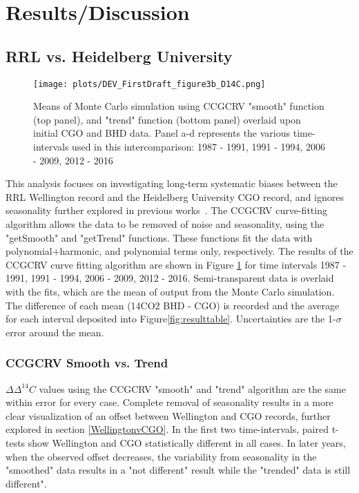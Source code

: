 \section{Results/Discussion}
\subsection{RRL vs. Heidelberg University}


\begin{figure}[h!]
  \texttt{[image: plots/DEV\_FirstDraft\_figure3b\_D14C.png]}
  \caption{Means of Monte Carlo simulation using CCGCRV "smooth" function (top panel), and "trend" function (bottom panel) overlaid upon initial CGO and BHD data. Panel a-d represents the various time-intervals used in this intercomparison: 1987 - 1991, 1991 - 1994, 2006 - 2009, 2012 - 2016}
  \label{fig:results1}
\end{figure}

This analysis focuses on investigating long-term systematic biases between the RRL Wellington record and the Heidelberg University CGO record, and ignores seasonality further explored in previous works~\cite{turnbull2017}. The CCGCRV curve-fitting algorithm allows the data to be removed of noise and seasonality, using the "getSmooth" and "getTrend" functions. These functions fit the data with polynomial+harmonic, and polynomial terms only, respectively. The results of the CCGCRV curve fitting algorithm are shown in Figure \ref{fig:results1} for time intervals 1987 - 1991, 1991 - 1994, 2006 - 2009, 2012 - 2016. Semi-transparent data is overlaid with the fits, which are the mean of output from the Monte Carlo simulation. The difference of each mean (14CO2 BHD - CGO) is recorded and the average for each interval deposited into Figure\ref{fig:resulttable}. Uncertainties are the 1-$\sigma$ error around the mean.

\subsubsection{CCGCRV Smooth vs. Trend}
${\Delta\Delta^{14}C}$ values using the CCGCRV "smooth" and "trend" algorithm are the same within error for every case. Complete removal of seasonality results in a more clear visualization of an offset between Wellington and CGO records, further explored in section \ref{WellingtonvCGO}. In the first two time-intervals, paired t-tests show Wellington and CGO statistically different in all cases. In later years, when the observed offset decreases, the variability from seasonality in the "smoothed" data results in a "not different" result while the "trended" data is still different".

